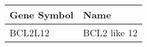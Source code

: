 \begin{tabular}{ll}
\toprule
Gene Symbol &         Name \\
\midrule
    BCL2L12 & BCL2 like 12 \\
\bottomrule
\end{tabular}
